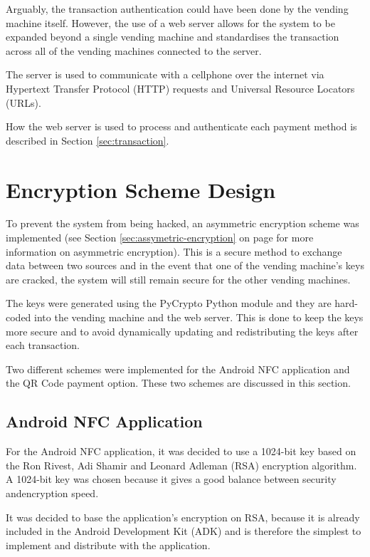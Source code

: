 Arguably, the transaction authentication could have been done by the vending
machine itself.
However, the use of a web server allows for the system to be expanded beyond a
single vending machine and standardises the transaction across all of the
vending machines connected to the server.

The server is used to communicate with a cellphone over the internet via
Hypertext Transfer Protocol (HTTP) requests and Universal Resource Locators
(URLs).

How the web server is used to process and authenticate each payment method is
described in Section \ref{sec:transaction}.
 
\section{Encryption Scheme Design}

To prevent the system from being hacked, an asymmetric encryption scheme was
implemented (see Section \ref{sec:assymetric-encryption} on page
\pageref{sec:assymetric-encryption} for more information on asymmetric encryption).
This is a secure method to exchange data between two sources and in the event that
one of the vending machine's keys are cracked, the system will still remain
secure for the other vending machines.

The keys were generated using the PyCrypto Python module and they are hard-coded
into the vending machine and the web server. This is done to keep the keys more
secure and to avoid dynamically updating and redistributing the keys after each
transaction.

Two different schemes were implemented for the Android NFC application and the
QR Code payment option. These two schemes are discussed in this section.

\subsection{Android NFC Application}

For the Android NFC application, it was decided to use a 1024-bit key based on
the Ron Rivest, Adi Shamir and Leonard Adleman (RSA) encryption algorithm. A 1024-bit key was chosen because it gives a good balance between security andencryption speed. 

It was decided to base the application's encryption on RSA, because it is
already included in the Android Development Kit (ADK) and is therefore the simplest to implement and distribute
with the application. 

